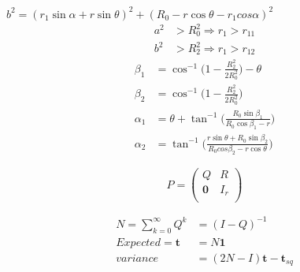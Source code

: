\documentclass{report}
\begin{document}
$
b^2 = (r_1\sin\alpha + r\sin\theta)^2 + (R_0-r\cos\theta-r_1cos\alpha)^2
$
\begin{align*}
	a^2 &> R_0^2 \Rightarrow r_1 > r_{11} \\
	b^2 &> R_2^2 \Rightarrow r_1 > r_{12}
\end{align*}
\begin{align*}
	\beta_1 &= \cos^{-1}\bigg(1-\frac{R_2^2}{2R_0^2}\bigg) - \theta \\
	\beta_2 &= \cos^{-1}\bigg(1-\frac{R_2^2}{2R_0^2}\bigg) \\
	\alpha_1 &= \theta + \tan^{-1}\bigg( \frac{R_0\sin\beta_1}{R_0\cos\beta_1-r}\bigg)\\
	\alpha_2 &= \tan^{-1}\bigg( \frac{r\sin\theta + R_0\sin\beta_2}{R_0cos\beta_2 - r\cos\theta} \bigg)
\end{align*}

\begin{equation*}
	P  = \left(
	\begin{array}{cc}
	Q & R \\
		\mathbf{0} & I_r \\
	\end{array} \right)
\end{equation*}

\begin{align*}
	N = \sum_{k=0}^{\infty} Q^k &= (I-Q)^{-1}\\
	Expected = \mathbf{t} &= N\mathbf{1} \\
	variance &= (2N-I)\mathbf{t} - \mathbf{t}_{sq}
\end{align*}
\end{document}
